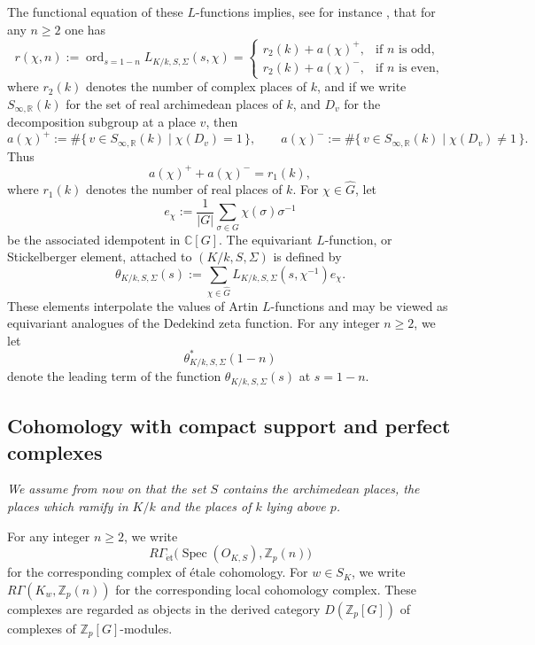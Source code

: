 \documentclass[a4paper,11pt]{article}
\begin{document}
\noindent The functional equation of these \(L\)-functions implies, see for instance
\cite[Proof of Lem.~6.14]{GreitherPopescu}, that for any \(n\geq 2\) one has
\begin{equation}\label{eq:35}
r(\chi,n):=\operatorname{ord}_{s=1-n}L_{K/k,S,\Sigma}(s,\chi)
=
\begin{cases}
r_2(k)+a(\chi)^+, & \text{if \(n\) is odd},\\[4pt]
r_2(k)+a(\chi)^-, & \text{if \(n\) is even},
\end{cases}
\end{equation}
where \(r_2(k)\) denotes the number of complex places of \(k\), and if we write
\(S_{\infty,\mathbb R}(k)\) for the set of real archimedean places of \(k\),
and \(D_v\) for the decomposition subgroup at a place \(v\), then
\[
a(\chi)^+
:=
\#\{\,v\in S_{\infty,\mathbb R}(k)\mid \chi(D_v)=1\,\},
\qquad
a(\chi)^-
:=
\#\{\,v\in S_{\infty,\mathbb R}(k)\mid \chi(D_v)\neq 1\,\}.
\]
Thus
\[
a(\chi)^+ + a(\chi)^- = r_1(k),
\]
where \(r_1(k)\) denotes the number of real places of \(k\).
For \(\chi\in\widehat G\), let
\[
e_\chi:=
\frac{1}{|G|}\sum_{\sigma\in G}\chi(\sigma)\sigma^{-1}
\]
be the associated idempotent in \(\mathbb C[G]\). The equivariant
\(L\)-function, or Stickelberger element, attached to \((K/k,S,\Sigma)\) is defined
by
\[
\theta_{K/k,S,\Sigma}(s)
:=
\sum_{\chi\in\widehat G}L_{K/k,S,\Sigma}(s,\chi^{-1})e_\chi.
\]
These elements interpolate the values of Artin \(L\)-functions and may be
viewed as equivariant analogues of the Dedekind zeta function. For any integer \(n\geq 2\), we let
\[
\theta^*_{K/k,S,\Sigma}(1-n)
\]
denote the leading term of the function \(\theta_{K/k,S,\Sigma}(s)\) at
\(s=1-n\).
\subsection{Cohomology with compact support and perfect complexes}\label{Sect_3_5}
\textit{We assume from now on that the set  \(S\)
contains the archimedean places, the places which ramify in $K/k$ and the places of \(k\) lying above \(p\).}


\noindent For any integer \(n\geq 2\),
we write
\[
R\Gamma_{\mathrm{\acute{e}t}}
\bigl(\operatorname{Spec}(O_{K,S}),\mathbb Z_p(n)\bigr)
\]
for the corresponding complex of étale cohomology. For \(w\in S_K\), we write
\(R\Gamma(K_w,\mathbb Z_p(n))\) for the corresponding local cohomology complex.
These complexes are regarded as objects in the derived category  $D(\mathbb Z_p[G])$ of complexes of
\(\mathbb Z_p[G]\)-modules.
\end{document}
